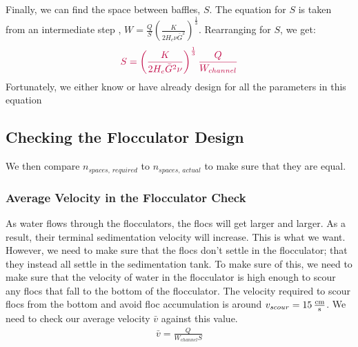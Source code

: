 \documentclass[letterpaper,10pt,english]{sphinxmanual}
\begin{document}
\section{}
\label{\detokenize{Flocculation/Floc_Design:baffle-spacing-math-s}}
Finally, we can find the space between baffles, \(S\). The equation for \(S\) is taken from an intermediate step , \(W = \frac{Q}{S}\left( \frac{K}{2 H_e \nu \bar G^2} \right)^\frac{1}{3}\). Rearranging for \(S\), we get:
\begin{equation}\label{equation:Flocculation/Floc_Design:Flocculation/Floc_Design:29}
\begin{split}\color{purple}{S = \left( \frac{K}{2 H_e \bar G^2 \nu } \right)^\frac{1}{3} \frac{Q}{W_{channel}}}\end{split}
\end{equation}
Fortunately, we either know or have already design for all the parameters in this equation


\subsection{Checking the Flocculator Design}
\label{\detokenize{Flocculation/Floc_Design:checking-the-flocculator-design}}
We then compare \(n_{spaces, \, required}\) to \(n_{spaces, \, actual}\) to make sure that they are equal.


\subsubsection{Average Velocity in the Flocculator Check}
\label{\detokenize{Flocculation/Floc_Design:average-velocity-in-the-flocculator-check}}
As water flows through the flocculators, the flocs will get larger and larger. As a result, their terminal sedimentation velocity will increase. This is what we want. However, we need to make sure that the flocs don’t settle in the flocculator; that they instead all settle in the sedimentation tank. To make sure of this, we need to make sure that the velocity of water in the flocculator is high enough to scour any flocs that fall to the bottom of the flocculator. The velocity required to scour flocs from the bottom and avoid floc accumulation is around \(v_{scour} = 15 \, {\rm \frac{cm}{s}}\). We need to check our average velocity \(\bar v\) against this value.
\begin{equation}\label{equation:Flocculation/Floc_Design:Flocculation/Floc_Design:30}
\begin{split}\bar v = \frac{Q}{W_{channel} S}\end{split}
\end{equation}
\end{document}
